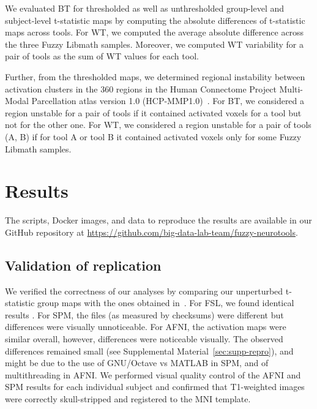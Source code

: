 \documentclass[11pt,onecolumn]{article}
\begin{document}
We evaluated BT for thresholded as well as unthresholded
group-level and subject-level t-statistic maps by computing the absolute
differences of t-statistic maps across tools. For WT, we computed the
average absolute difference across the three Fuzzy Libmath samples.
Moreover, we computed WT variability for a pair of tools as the sum of WT values for each tool.

Further, from the thresholded maps, we determined regional instability
between activation clusters in the 360 regions in the Human Connectome
Project Multi-Modal Parcellation atlas version 1.0
(HCP-MMP1.0)~\cite{glasser2016multi}. For BT, we considered a region
unstable for a pair of tools if it contained activated voxels for a tool
but not for the other one. For WT, we considered a region unstable for a
pair of tools (A, B) if for tool A or tool B it contained activated voxels only for some Fuzzy Libmath
samples.

\section{Results}
The scripts, Docker images, and data  to reproduce the results are available
in our GitHub repository at
\url{https://github.com/big-data-lab-team/fuzzy-neurotools}.


\subsection{Validation of replication}

We verified the correctness of our analyses by comparing our unperturbed
t-statistic group maps with the ones obtained
in~\cite{bowring2019exploring}. For FSL, we found
identical results . For SPM, the files (as measured by checksums) were different but differences
were visually unnoticeable. For AFNI, the activation maps were similar
overall, however, differences were noticeable visually.
The observed differences remained small  (see Supplemental Material~\ref{sec:supp-repro}), and might be due to the use of
GNU/Octave vs MATLAB in SPM, and of multithreading in AFNI. We performed visual quality control of the AFNI
and SPM results for each individual subject and confirmed that T1-weighted images were
correctly skull-stripped and registered to the MNI template.
\end{document}
